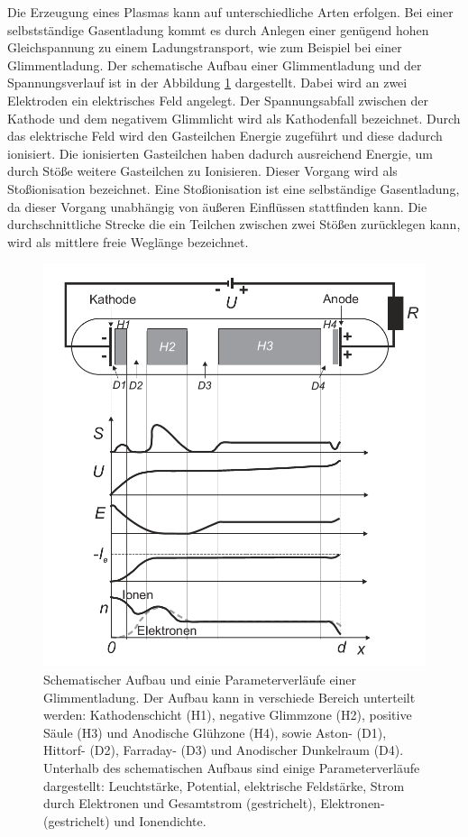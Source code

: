 Die Erzeugung eines Plasmas kann auf unterschiedliche Arten erfolgen. Bei einer selbstständige Gasentladung kommt es durch Anlegen einer genügend hohen Gleichspannung zu einem Ladungstransport, wie zum Beispiel bei einer Glimmentladung.  Der schematische Aufbau einer Glimmentladung und der Spannungsverlauf ist in der Abbildung \ref{fig:Glimmentladung} dargestellt.  Dabei wird an zwei Elektroden ein elektrisches Feld angelegt. Der Spannungsabfall zwischen der Kathode und dem negativem Glimmlicht wird als Kathodenfall bezeichnet. Durch das elektrische Feld wird den Gasteilchen Energie zugeführt und diese dadurch ionisiert.  Die ionisierten Gasteilchen haben dadurch ausreichend Energie,  um  durch Stöße weitere Gasteilchen zu  Ionisieren. Dieser Vorgang wird als Stoßionisation bezeichnet. Eine Stoßionisation ist eine selbständige Gasentladung, da dieser Vorgang unabhängig von äußeren Einflüssen stattfinden kann. Die durchschnittliche Strecke die ein Teilchen zwischen zwei Stößen zurücklegen kann, wird als mittlere freie Weglänge bezeichnet. 
\begin{figure}[H]
\centering
\includegraphics[scale=0.6]{Glimmentladung}
\caption{Schematischer Aufbau und einie Parameterverläufe einer Glimmentladung. Der Aufbau kann in verschiede Bereich unterteilt werden: Kathodenschicht (H1), negative Glimmzone (H2), positive Säule (H3) und Anodische Glühzone (H4), sowie Aston- (D1), Hittorf- (D2), Farraday- (D3) und Anodischer Dunkelraum (D4). Unterhalb des schematischen Aufbaus sind einige Parameterverläufe dargestellt: Leuchtstärke, Potential, elektrische Feldstärke, Strom durch Elektronen und Gesamtstrom (gestrichelt), Elektronen- (gestrichelt) und Ionendichte.   \cite{Plasmaphysik}}
\label{fig:Glimmentladung}
\end{figure}
